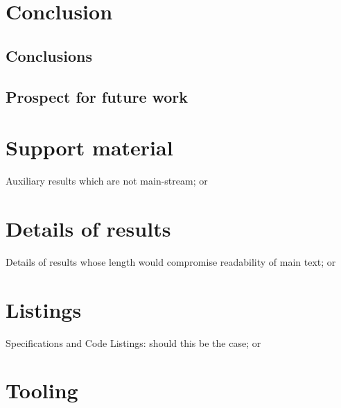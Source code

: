 \documentclass[
  twoside,
  11pt, a4paper,
  footinclude=true,
  headinclude=true,
  cleardoublepage=empty
]{scrbook}
\begin{document}
  \chapter{Conclusion} \label{conclusion}

    \section{Conclusions} \label{conclusion:conclusions}

    \section{Prospect for future work} \label{conclusion:future-work}



  

  \printindex


    \chapter{Support material} \label{support-material}
      Auxiliary results which are not main-stream; or

    \chapter{Details of results} \label{results}
      Details of results whose length would compromise readability of main text; or

    \chapter{Listings} \label{listings}
      Specifications and Code Listings: should this be the case; or

    \chapter{Tooling} \label{tooling}
\end{document}

